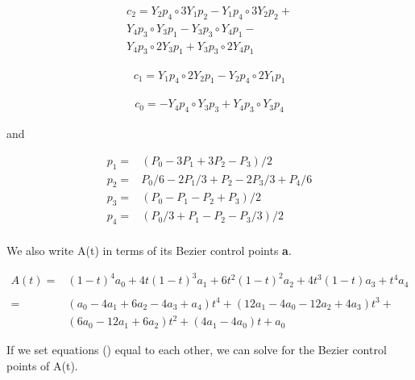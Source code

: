 \documentclass{article}
\begin{document}
\begin{equation}
\begin{aligned}
    c_2 =  Y_2 p_4 \circ  3 Y_1 p_2 -  Y_1 p_4 \circ  3 Y_2 p_2 +  \\
            Y_4 p_3 \circ  Y_3 p_1 -  Y_3 p_3 \circ  Y_4 p_1 - \\
            Y_4 p_3 \circ  2 Y_3 p_1 +  Y_3 p_3 \circ  2 Y_4 p_1
\end{aligned}
\end{equation}

\begin{equation}
\begin{aligned}
    c_1 =  Y_1  p_4 \circ  2 Y_2 p_1 -  Y_2 p_4 \circ  2 Y_1 p_1
\end{aligned}
\end{equation}

\begin{equation}
\begin{aligned}
    c_0 = -  Y_4 p_4 \circ  Y_3 p_3 +  Y_4 p_3 \circ  Y_3 p_4
\end{aligned}
\end{equation}

and

\begin{equation}
\begin{aligned}
    p_1 =& (P_0 - 3P_1 + 3P_2 - P_3)/2 \\
    p_2 =& P_0/6 - 2P_1/3 + P_2 - 2P_3/3 + P_4/6 \\
    p_3 =& (P_0 - P_1 - P_2 + P_3)/2 \\
    p_4 =& (P_0/3 + P_1 - P_2 - P_3/3)/2 \\
\end{aligned}
\end{equation}
 
 We also write A(t) in terms of its Bezier control points \textbf{a}.
 
\begin{equation} 
\begin{aligned}
A(t) =& (1-t)^4a_0 + 4t(1-t)^3a_1 + 6t^2(1-t)^2a_2 + 4t^3(1-t)a_3 + t^4a_4 \\\\
=& (a_0 - 4a_1 + 6a_2 - 4a_3 +
a_4)t^4 + (12a_1 - 4a_0 - 12a_2 + 4a_3)t^3 + \\
&(6a_0 - 12a_1 + 6a_2)t^2 + (4a_1 - 4a_0)t + a_0
\end{aligned}
\end{equation}
 
 If we set equations () equal to each other, we can solve for the Bezier control points of A(t).
 
\end{document}
